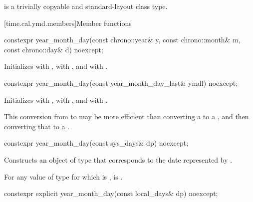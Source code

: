 \pnum
{} is a trivially copyable and standard-layout class type.

[time.cal.ymd.members]{Member functions}

%
\begin{itemdecl}
constexpr year_month_day(const chrono::year& y, const chrono::month& m,
                         const chrono::day& d) noexcept;
\end{itemdecl}

\begin{itemdescr}
\pnum
\effects
Initializes
 with ,
 with , and
 with .
\end{itemdescr}

%
\begin{itemdecl}
constexpr year_month_day(const year_month_day_last& ymdl) noexcept;
\end{itemdecl}

\begin{itemdescr}
\pnum
\effects
Initializes
 with ,
 with , and
 with .
\begin{note}
This conversion from  to 
may be more efficient than converting a  to a ,
and then converting that  to a .
\end{note}
\end{itemdescr}

%
\begin{itemdecl}
constexpr year_month_day(const sys_days& dp) noexcept;
\end{itemdecl}

\begin{itemdescr}
\pnum
\effects
Constructs an object of type 
that corresponds to the date represented by .

\pnum
\remarks
For any value  of type 
for which  is ,
is .
\end{itemdescr}

%
\begin{itemdecl}
constexpr explicit year_month_day(const local_days& dp) noexcept;
\end{itemdecl}

